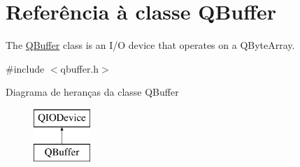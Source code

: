 \hypertarget{class_q_buffer}{\section{Referência à classe Q\-Buffer}
\label{class_q_buffer}
}


The \hyperlink{class_q_buffer}{Q\-Buffer} class is an I/\-O device that operates on a Q\-Byte\-Array.  




{\ttfamily \#include $<$qbuffer.\-h$>$}

Diagrama de heranças da classe Q\-Buffer\begin{figure}[H]
\begin{center}
\leavevmode
\includegraphics[height=2.000000cm]{class_q_buffer}
\end{center}
\end{figure}
